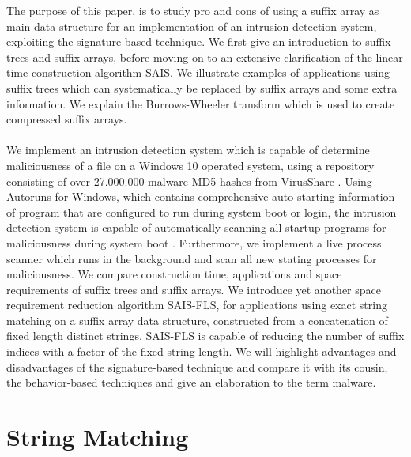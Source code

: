 \documentclass[12pt]{article} %
\begin{document}
The purpose of this paper, is to study pro and cons of using  a suffix array as main data structure for an implementation of an intrusion detection system, exploiting  the signature-based technique. We first give an introduction to suffix trees and suffix arrays, before moving on to an extensive clarification of the linear time construction algorithm SAIS. We illustrate examples of applications using suffix trees which can systematically be replaced by suffix arrays and some extra information. We explain the Burrows-Wheeler transform which is used to create compressed suffix arrays. \\ \\
We implement an intrusion detection system which is capable of determine maliciousness of a file on a Windows 10 operated system, using a repository consisting of over 27.000.000 malware MD5 hashes from \href {https://virusshare.com}{VirusShare} \cite{virusshare}. Using Autoruns for Windows, which contains comprehensive auto starting information of program that are configured to run during system boot or login, the intrusion detection system is capable of automatically scanning all startup programs for maliciousness during system boot \cite{autoruns}. Furthermore,  we implement a live process scanner which runs in the background and scan all new stating processes for maliciousness.  
We compare construction time, applications and space requirements of suffix trees and suffix arrays. We introduce yet another space requirement reduction algorithm SAIS-FLS, for applications using exact string matching on a suffix array data structure, constructed from a concatenation of fixed length distinct strings. SAIS-FLS  is capable of reducing the number of suffix indices with a factor of the fixed string length. We will highlight advantages and disadvantages of the signature-based technique and compare it with its cousin, the behavior-based techniques and give an elaboration to the term malware. 

\section {String Matching}
\end{document}
